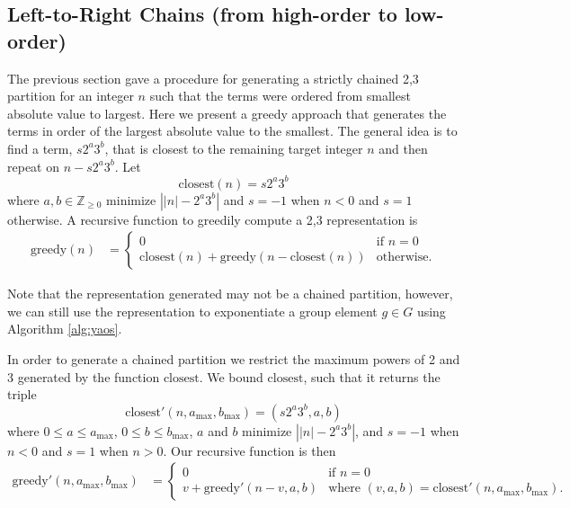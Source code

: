\documentclass{ucalgthes1}
\theoremstyle{definition}
\newcommand{\ZZgez}{\mathbb{Z}_{\ge 0}}
\newcommand{\amax}{a_\textrm{max}}
\newcommand{\bmax}{b_\textrm{max}}
\begin{document}
\bigbreak
\subsection{Left-to-Right Chains (from high-order to low-order)}

\newcommand{\greedyltor}{\textrm{greedy}}
\newcommand{\greedychain}{\textrm{greedy}'}
\newcommand{\greedybound}{\textrm{greedy}''}
\newcommand{\closest}{\textrm{closest}}

The previous section gave a procedure for generating a strictly chained 2,3 partition for an integer $n$ such that the terms were ordered from smallest absolute value to largest.  Here we present a greedy approach that generates the terms in order of the largest absolute value to the smallest. The general idea is to find a term, $s2^a3^b$, that is closest to the remaining target integer $n$ and then repeat on $n - s2^a3^b$. Let
\[
\closest(n) = s2^a3^b
\]
where $a,b \in \ZZgez$ minimize $\left| |n| - 2^a3^b \right|$ and $s = -1$ when $n < 0$ and $s = 1$ otherwise. A recursive function to greedily compute a 2,3 representation is
\begin{align*}
\greedyltor(n) &= \begin{cases}
              0 & \textrm{if $n = 0$} \\
              \closest(n) + \greedyltor(n - \closest(n)) & \textrm{otherwise}.
          \end{cases}
\end{align*}

\noindent
Note that the representation generated may not be a chained partition, however, we can still use the representation to exponentiate a group element $g \in G$ using Algorithm \ref{alg:yaos}.

In order to generate a chained partition we restrict the maximum powers of 2 and 3 generated by the function $\closest$.  We bound $\closest$, such that it returns the triple
\[
\closest'(n, \amax, \bmax) = (s2^a3^b, a, b)
\]
where $0 \le a \le \amax$, $0 \le b \le \bmax$, $a$ and $b$ minimize $\left| |n| - 2^a3^b \right|$, and $s=-1$ when $n < 0$ and $s=1$ when $n > 0$. Our recursive function is then
\begin{align*}
\greedychain(n, \amax, \bmax) &= \begin{cases}
        0 & \textrm{if $n = 0$} \\
        v + \greedychain(n - v, a, b) & \textrm{where $(v, a, b) = \closest'(n, \amax, \bmax)$}.
    \end{cases}
\end{align*}
\end{document}
